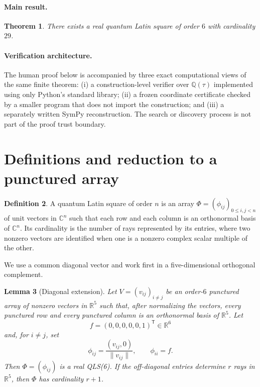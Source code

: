 \documentclass[11pt]{article}
\newtheorem{theorem}{Theorem}
\newtheorem{lemma}[theorem]{Lemma}
\theoremstyle{definition}
\newtheorem{definition}[theorem]{Definition}
\theoremstyle{plain}
\newcommand{\R}{\mathbb{R}}
\newcommand{\C}{\mathbb{C}}
\newcommand{\Q}{\mathbb{Q}}
\begin{document}
\paragraph{Main result.}
\begin{theorem}\label{thm:main}
There exists a real quantum Latin square of order \(6\) with cardinality \(29\).
\end{theorem}

\paragraph{Verification architecture.}
The human proof below is accompanied by three exact computational views of the same finite theorem:
(i) a construction-level verifier over \(\Q(\tau)\) implemented using only Python's standard library;
(ii) a frozen coordinate certificate checked by a smaller program that does not import the construction;
and (iii) a separately written SymPy reconstruction.
The search or discovery process is not part of the proof trust boundary.

\section{Definitions and reduction to a punctured array}

\begin{definition}
A quantum Latin square of order \(n\) is an array
\(\Phi=(\phi_{ij})_{0\leq i,j<n}\) of unit vectors in \(\C^n\) such that each row and each column is an orthonormal basis of \(\C^n\).
Its cardinality is the number of rays represented by its entries, where two nonzero vectors are identified when one is a nonzero complex scalar multiple of the other.
\end{definition}

We use a common diagonal vector and work first in a five-dimensional orthogonal complement.

\begin{lemma}[Diagonal extension]\label{lem:diagonal}
Let \(V=(v_{ij})_{i\neq j}\) be an order-\(6\) punctured array of nonzero vectors in \(\R^5\) such that, after normalizing the vectors, every punctured row and every punctured column is an orthonormal basis of \(\R^5\).
Let
\[
f=(0,0,0,0,0,1)^{\mathsf T}\in\R^6
\]
and, for \(i\neq j\), set
\[
\phi_{ij}=\frac{(v_{ij},0)}{\|v_{ij}\|},\qquad \phi_{ii}=f.
\]
Then \(\Phi=(\phi_{ij})\) is a real QLS(6).
If the off-diagonal entries determine \(r\) rays in \(\R^5\), then \(\Phi\) has cardinality \(r+1\).
\end{lemma}
\end{document}
